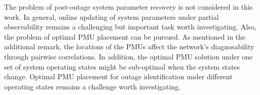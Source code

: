 The problem of post-outage system parameter recovery is not considered in this work. In general, online updating of system parameters under partial observability remains a challenging but important task worth investigating. Also, the problem of optimal PMU placement can be pursued. As mentioned in the additional remark, the locations of the PMUs affect the network's diagnosability through pairwise correlations. In addition, the optimal PMU solution under one set of system operating states might be sub-optimal when the system states change. Optimal PMU placement for outage identification under different operating states remains a challenge worth investigating. 

